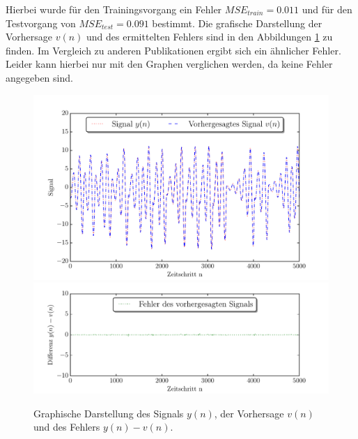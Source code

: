 Hierbei wurde für den Trainingsvorgang ein Fehler $MSE_{train} = 0.011$ und für den Testvorgang von $MSE_{test} = 0.091$ bestimmt. Die grafische Darstellung der Vorhersage $v(n)$ und des ermittelten Fehlers sind in den Abbildungen \ref{fig:application_roessler_b1} zu finden. Im Vergleich zu anderen Publikationen \cite{parlitz2005} ergibt sich ein ähnlicher Fehler. Leider kann hierbei nur mit den Graphen verglichen werden, da keine Fehler angegeben sind.

\begin{figure}[H]
    \centering
     \includegraphics[width = 0.9 \textwidth]{figures/roessler_cross_pred.pdf}
     \includegraphics[width = 0.9 \textwidth]{figures/roessler_cross_err.pdf}
    \caption{Graphische Darstellung des Signals $y(n)$, der Vorhersage $v(n)$ und des Fehlers $y(n)-v(n)$.}
    \label{fig:application_roessler_b1}
\end{figure}

